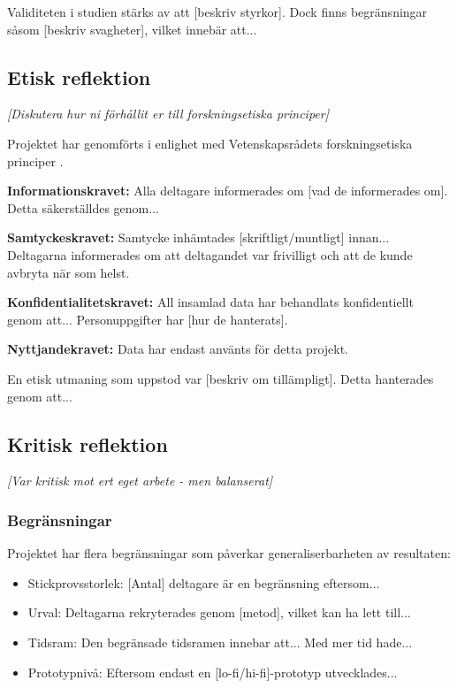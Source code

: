 Validiteten i studien stärks av att [beskriv styrkor]. Dock finns begränsningar såsom [beskriv svagheter], vilket innebär att...


\subsection{Etisk reflektion}

\textit{[Diskutera hur ni förhållit er till forskningsetiska principer]}

Projektet har genomförts i enlighet med Vetenskapsrådets forskningsetiska principer \cite{vetenskapsradet2002}.

\textbf{Informationskravet:} Alla deltagare informerades om [vad de informerades om]. Detta säkerställdes genom...

\textbf{Samtyckeskravet:} Samtycke inhämtades [skriftligt/muntligt] innan... Deltagarna informerades om att deltagandet var frivilligt och att de kunde avbryta när som helst.

\textbf{Konfidentialitetskravet:} All insamlad data har behandlats konfidentiellt genom att... Personuppgifter har [hur de hanterats].

\textbf{Nyttjandekravet:} Data har endast använts för detta projekt.

En etisk utmaning som uppstod var [beskriv om tillämpligt]. Detta hanterades genom att...


\subsection{Kritisk reflektion}

\textit{[Var kritisk mot ert eget arbete - men balanserat]}

\subsubsection{Begränsningar}

Projektet har flera begränsningar som påverkar generaliserbarheten av resultaten:

\begin{itemize}
    \item Stickprovsstorlek: [Antal] deltagare är en begränsning eftersom...
    \item Urval: Deltagarna rekryterades genom [metod], vilket kan ha lett till...
    \item Tidsram: Den begränsade tidsramen innebar att... Med mer tid hade...
    \item Prototypnivå: Eftersom endast en [lo-fi/hi-fi]-prototyp utvecklades...
\end{itemize}


